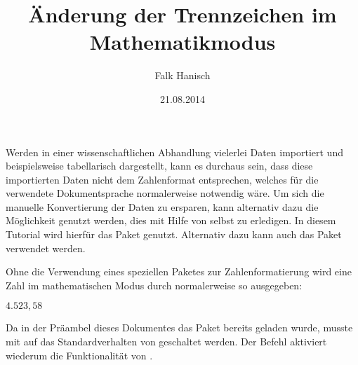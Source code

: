 \documentclass[english,ngerman]{tudscrartcl}
\begin{document}
\title{Änderung der Trennzeichen im Mathematikmodus}
\author{Falk Hanisch}
\date{21.08.2014}
\makeatletter
\begingroup%
  \def\and{, }%
  \let\thanks\@gobble%
  \let\footnote\@gobble%
\endgroup%
\markright{\@title}
\makeatother
\StartTutorial
{}
%
Werden in einer wissenschaftlichen Abhandlung vielerlei Daten importiert und 
beispielsweise tabellarisch dargestellt, kann es durchaus sein, dass diese 
importierten Daten nicht dem Zahlenformat entsprechen, welches für die 
verwendete Dokumentsprache normalerweise notwendig wäre. Um sich die manuelle 
Konvertierung der Daten zu ersparen, kann alternativ dazu die Möglichkeit 
genutzt werden, dies mit Hilfe von  selbst zu erledigen. In 
diesem Tutorial wird hierfür das Paket  genutzt. Alternativ 
dazu kann auch das Paket  verwendet werden.

Ohne die Verwendung eines speziellen Paketes zur Zahlenformatierung wird eine 
Zahl im mathematischen Modus durch  normalerweise so 
ausgegeben: 
%
\begin{Excerpt}
\mathswapoff
\(4.523,58\)
\mathswapon
\end{Excerpt}
%
Da in der Präambel dieses Dokumentes das Paket  bereits 
geladen wurde, musste mit  auf das Standardverhalten von 
 geschaltet werden. Der Befehl  aktiviert 
wiederum die Funktionalität von .
\end{document}
